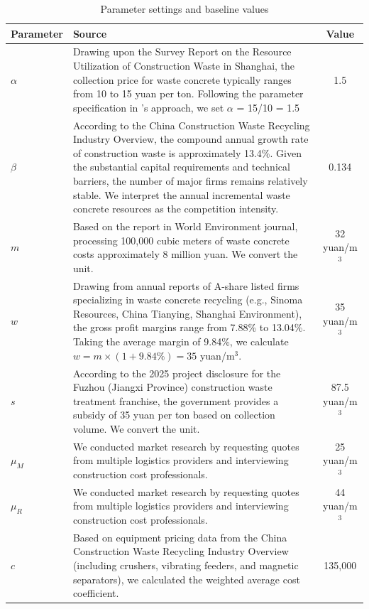 \documentclass[authoryear,preprint,review,times,10pt]{elsarticle}
\begin{document}
\begin{table}[!htbp]
\centering
\captionsetup{font=normalsize, labelsep=period}
\caption{Parameter settings and baseline values}
\label{tab:parameters}
\normalsize
\begin{tabular}{lp{10cm}c}
\toprule
\textbf{Parameter} & \textbf{Source} & \textbf{Value} \\
\midrule
$\alpha$ & Drawing upon the Survey Report on the Resource Utilization of Construction Waste in Shanghai, the collection price for waste concrete typically ranges from 10 to 15 yuan per ton. Following the parameter specification in \citep{wang2025Mechanism}'s approach, we set $\alpha$ = 15/10 = 1.5 & 1.5 \\
\midrule
$\beta$ & According to the China Construction Waste Recycling Industry Overview, the compound annual growth rate of construction waste is approximately 13.4\%. Given the substantial capital requirements and technical barriers, the number of major firms remains relatively stable. We interpret the annual incremental waste concrete resources as the competition intensity. & 0.134 \\
\midrule
$m$ & Based on the report in World Environment journal, processing 100,000 cubic meters of waste concrete costs approximately 8 million yuan. We convert the unit. & 32 yuan/m$^3$ \\
\midrule
$w$ & Drawing from annual reports of A-share listed firms specializing in waste concrete recycling (e.g., Sinoma Resources, China Tianying, Shanghai Environment), the gross profit margins range from 7.88\% to 13.04\%. Taking the average margin of 9.84\%, we calculate $w = m \times (1 + 9.84\%) = 35$ yuan/m$^3$. & 35 yuan/m$^3$ \\
\midrule
$s$ & According to the 2025 project disclosure for the Fuzhou (Jiangxi Province) construction waste treatment franchise, the government provides a subsidy of 35 yuan per ton based on collection volume. We convert the unit. & 87.5 yuan/m$^3$ \\
\midrule
$\mu_M$ & We conducted market research by requesting quotes from multiple logistics providers and interviewing construction cost professionals. & 25 yuan/m$^3$ \\
\midrule
$\mu_R$ & We conducted market research by requesting quotes from multiple logistics providers and interviewing construction cost professionals. & 44 yuan/m$^3$ \\
\midrule
$c$ & Based on equipment pricing data from the China Construction Waste Recycling Industry Overview (including crushers, vibrating feeders, and magnetic separators), we calculated the weighted average cost coefficient. & 135,000 \\

\end{tabular}
\end{table}
\end{document}
